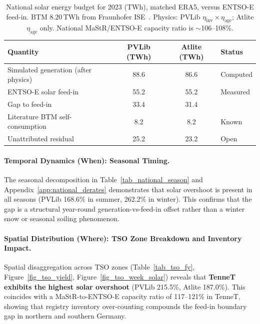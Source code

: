 \documentclass[preprint,12pt,number]{elsarticle}
\begin{document}
\begin{table}[htbp]
\caption{%
National solar energy budget for 2023 (TWh), matched ERA5, versus ENTSO-E feed-in.
BTM $8.20$\,TWh from Fraunhofer ISE~\citep{FraunhoferISE2025SelfConsumption}.
Physics: PVLib $\eta_{\mathrm{inv}}\times\eta_{\mathrm{age}}$; Atlite $\eta_{\mathrm{age}}$ only.
National MaStR/ENTSO-E capacity ratio is $\sim$106--108\%.\label{tab_residual_budget}
}

\begin{tabularx}{\textwidth}{lCCl}
\toprule
\textbf{Quantity} & \textbf{PVLib (TWh)} & \textbf{Atlite (TWh)} & \textbf{Status}\\
\midrule
Simulated generation (after physics) & 88.6 & 86.6 & Computed\\
ENTSO-E solar feed-in & 55.2 & 55.2 & Measured\\
Gap to feed-in & 33.4 & 31.4 & \\
\midrule
Literature BTM self-consumption & 8.2 & 8.2 & Known~\citep{FraunhoferISE2025SelfConsumption}\\
Unattributed residual & 25.2 & 23.2 & Open\\
\bottomrule
\end{tabularx}
\end{table}

\paragraph{Temporal Dynamics (When): Seasonal Timing.}
The seasonal decomposition in Table~\ref{tab_national_season} and Appendix~\ref{app:national_derates} demonstrates that solar overshoot is present in all seasons (PVLib 168.6\% in summer, 262.2\% in winter).
This confirms that the gap is a structural year-round generation-vs-feed-in offset rather than a winter snow or seasonal soiling phenomenon.

\paragraph{Spatial Distribution (Where): TSO Zone Breakdown and Inventory Impact.}
Spatial disaggregation across TSO zones (Table~\ref{tab_tso_fy}, Figure~\ref{fig_tso_yield}, Figure~\ref{fig_tso_week_solar}) reveals that \textbf{TenneT exhibits the highest solar overshoot} (PVLib 215.5\%, Atlite 187.0\%).
This coincides with a MaStR-to-ENTSO-E capacity ratio of 117--121\% in TenneT, showing that registry inventory over-counting compounds the feed-in boundary gap in northern and southern Germany.
\end{document}
